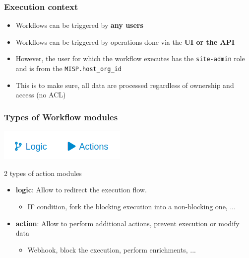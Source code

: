 \begin{frame}
    \frametitle{Execution context}
    \begin{itemize}
        \item Workflows can be triggered by \textbf{any users}
        \item Workflows can be triggered by operations done via the \textbf{UI or the API}
        \item However, the user for which the workflow executes has the \texttt{site-admin} role and is from the \texttt{MISP.host\_org\_id}
        \item This is to make sure, all data are processed regardless of ownership and access (no ACL)
    \end{itemize}
\end{frame}

\begin{frame}
    \frametitle{Types of Workflow modules}
    \begin{center}
        \includegraphics[width=0.5\linewidth]{pictures/module-type.png}
    \end{center}
    2 types of action modules
    \begin{itemize}
        \item \textbf{logic}: Allow to redirect the execution flow.
        \begin{itemize}
            \item IF condition, fork the blocking execution into a non-blocking one, ...
        \end{itemize}
        \item \textbf{action}: Allow to perform additional actions, prevent execution or modify data
        \begin{itemize}
            \item Webhook, block the execution, perform enrichments, ...
        \end{itemize}
    \end{itemize}
\end{frame}

